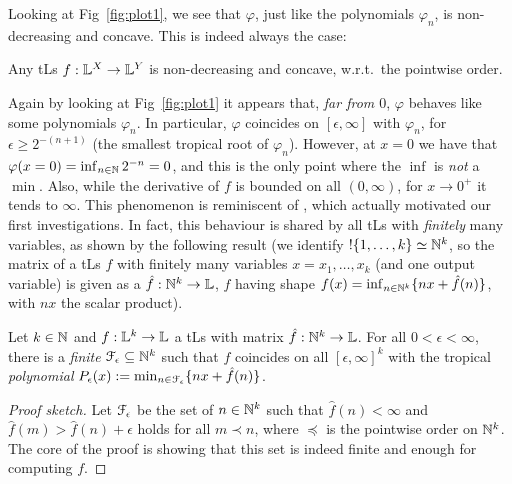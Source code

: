 Looking at Fig~\ref{fig:plot1}, we see that $\varphi$, just like the polynomials $\varphi_{n}$, is non-decreasing and concave.
This is indeed always the case:

\begin{proposition}\label{prop:nondecr+conc}
 Any tLs $f:\mathbb{L}^X\to\mathbb{L}^Y$ is non-decreasing and concave, w.r.t.\ the pointwise order.
\end{proposition}

Again by looking at Fig~\ref{fig:plot1} it appears that, \emph{far from $0$}, $\varphi$ behaves like some polynomials $\varphi_{n}$.
In particular, %
$\varphi$ coincides on $[\epsilon,\infty]$ with $\varphi_{n}$,
for $\epsilon \geq 2^{-(n+1)}$ (the smallest tropical root of $\varphi_{n}$).
However, at
%
 $x=0$ we have that $\varphi(x=0)=\inf_{n\in\mathbb{N}} 2^{-n}=0$, and this is the only point where the $\inf$ is \emph{not} a $\min$.
Also, while the derivative of $f$ is bounded on all $(0,\infty)$, for $x\to 0^+$ it tends to $\infty$.
This phenomenon is reminiscent of \cite[Example 7]{Ehrhard2005},
which actually motivated our first investigations.
In fact, this behaviour is shared by all tLs with \emph{finitely} many variables, as shown by the following result (we identify $!\{1,\dots,k\}\simeq \mathbb{N}^k$, so the matrix of a tLs $f$ with finitely many variables $x=x_1,\dots,x_k$ (and one output variable) is given as a $\hat{f}:\mathbb{N}^k\to\mathbb{L}$, $f$ having shape $f(x)=\inf_{n\in \mathbb{N}^k}\{nx+\hat{f}(n)\}$, with $nx$ the scalar product).

\begin{theorem}\label{theorem:fepsilon}
 Let $k\in\mathbb{N}$ and $f:\mathbb{L}^k\to\mathbb{L}$ a tLs with matrix $\hat{f}:\mathbb{N}^k\to\mathbb{L}$.
 For all $0<\epsilon<\infty$, there is a \emph{finite} $\mathcal{F}_\epsilon \subseteq \mathbb{N}^k$ such that 
% 
$f$ coincides on all $[\epsilon,\infty]^k$ with the tropical \emph{polynomial} $P_\epsilon(x):=\min_{n\in \mathcal{F}_\epsilon}\{nx+\hat{f}(n)\}$.
\end{theorem}
\begin{proof}[Proof sketch]
Let $\mathcal{F}_\epsilon$ be the set of $n\in\mathbb{N}^{k}$ such that 
$\widehat f(n)<\infty$ and $\widehat f(m)> \widehat f(n)+\epsilon$ holds for all $m\prec n$, where $\preceq$ is the pointwise order on $\mathbb{N}^k$.
The core of the proof is showing that this set is indeed finite and enough for computing $f$.
\end{proof}




